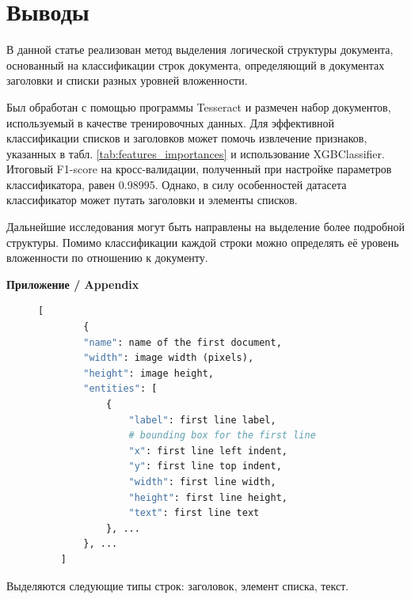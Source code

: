 \documentclass{ProcISPRAS}
\begin{document}
\section{Выводы}

В данной статье реализован метод выделения логической структуры документа, основанный на классификации строк документа, определяющий в документах заголовки и списки разных уровней вложенности.

Был обработан с помощью программы Tesseract и размечен набор документов, используемый в качестве тренировочных данных. Для эффективной классификации списков и заголовков может помочь извлечение признаков, указанных в табл. \ref{tab:features_importances} и использование XGBClassifier. Итоговый F1-score на кросс-валидации, полученный при настройке параметров классификатора, равен 0.98995. Однако, в силу особенностей датасета классификатор может путать заголовки и элементы списков.

Дальнейшие исследования могут быть направлены на выделение более подробной структуры. Помимо классификации каждой строки можно определять её уровень вложенности по отношению к документу.

\printbibliography

{\vskip 12pt\normalfont\sffamily\bfseries\large Приложение / Appendix}
\setlength{\parskip}{6pt}

\begin{figure}[ht]
    \centering
    \begin{lstlisting}[language=Python,frame=none,basicstyle=\ttfamily]
    [
        {
        "name": name of the first document,
        "width": image width (pixels),
        "height": image height,
        "entities": [
            {
                "label": first line label,
                # bounding box for the first line
                "x": first line left indent,
                "y": first line top indent,
                "width": first line width,
                "height": first line height,
                "text": first line text
            }, ...
        }, ...
    ]
    \end{lstlisting}
    \label{fig:label}
\end{figure}

Выделяются следующие типы строк: заголовок, элемент списка, текст.
\end{document}
